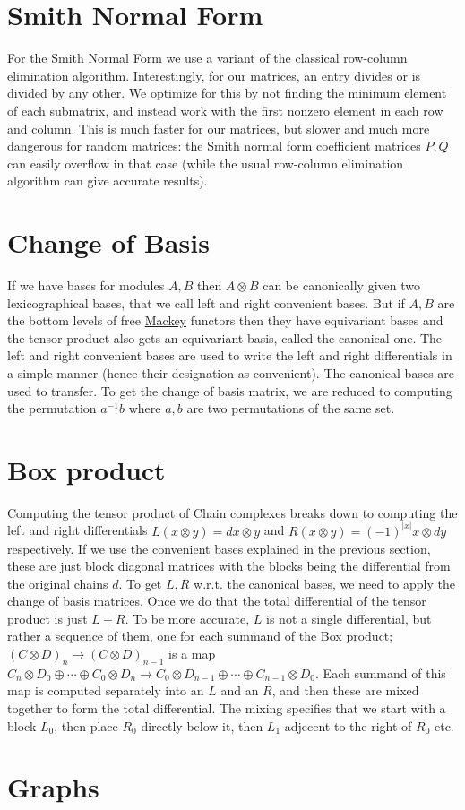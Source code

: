 \hypertarget{algo_smith}{}\section{Smith Normal Form}\label{algo_smith}
For the Smith Normal Form we use a variant of the classical row-\/column elimination algorithm. Interestingly, for our matrices, an entry divides or is divided by any other. We optimize for this by not finding the minimum element of each submatrix, and instead work with the first nonzero element in each row and column. This is much faster for our matrices, but slower and much more dangerous for random matrices\+: the Smith normal form coefficient matrices $P,Q$ can easily overflow in that case (while the usual row-\/column elimination algorithm can give accurate results).\hypertarget{algo_cob}{}\section{Change of Basis}\label{algo_cob}
If we have bases for modules $A,B$ then $A\otimes B$ can be canonically given two lexicographical bases, that we call left and right convenient bases. But if $A,B$ are the bottom levels of free \hyperlink{namespaceMackey}{Mackey} functors then they have equivariant bases and the tensor product also gets an equivariant basis, called the canonical one. The left and right convenient bases are used to write the left and right differentials in a simple manner (hence their designation as convenient). The canonical bases are used to transfer. To get the change of basis matrix, we are reduced to computing the permutation $a^{-1}b$ where $a,b$ are two permutations of the same set.\hypertarget{algo_box}{}\section{Box product}\label{algo_box}
Computing the tensor product of Chain complexes breaks down to computing the left and right differentials $L(x\otimes y)=dx\otimes y$ and $R(x\otimes y)=(-1)^{|x|}x\otimes dy$ respectively. If we use the convenient bases explained in the previous section, these are just block diagonal matrices with the blocks being the differential from the original chains $d$. To get $L,R$ w.\+r.\+t. the canonical bases, we need to apply the change of basis matrices. Once we do that the total differential of the tensor product is just $L+R$. To be more accurate, $L$ is not a single differential, but rather a sequence of them, one for each summand of the Box product; $(C\otimes D)_n\to (C\otimes D)_{n-1}$ is a map $C_n\otimes D_0\oplus\cdots \oplus C_0\otimes D_n\to C_0\otimes D_{n-1}\oplus\cdots\oplus C_{n-1}\otimes D_0$. Each summand of this map is computed separately into an $L$ and an $R$, and then these are mixed together to form the total differential. The mixing specifies that we start with a block $ L_0$, then place $ R_0$ directly below it, then $L_1$ adjecent to the right of $ R_0$ etc.\hypertarget{algo_graph}{}\section{Graphs}\label{algo_graph}

